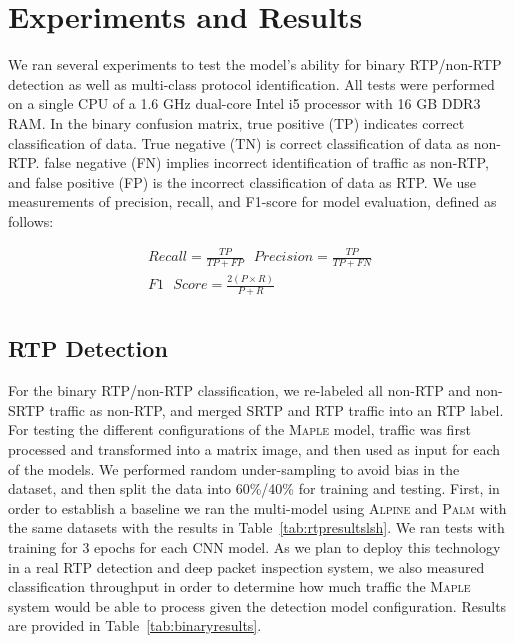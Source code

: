 \section{Experiments and Results}

We ran several experiments to test the model's ability for binary RTP/non-RTP detection as well as multi-class protocol identification. All tests were performed on a single CPU of a 1.6 GHz dual-core Intel i5 processor with 16 GB DDR3 RAM. In the binary confusion matrix, true positive (TP) indicates correct classification of data. True negative (TN) is correct classification of data as non-RTP. false negative (FN) implies incorrect identification of traffic as non-RTP, and false positive (FP) is the incorrect classification of data as RTP. We use measurements of precision, recall, and F1-score for model evaluation, defined as follows:

\begin{equation}
\begin{split}
    Recall = \frac{TP}{TP + FP} \text{  }
    Precision = \frac{TP}{TP + FN} \\
    F1\text{ }Score = \frac{2(P\times R)}{P + R} \\
    \end{split}
\end{equation}

\subsection{RTP Detection}

For the binary RTP/non-RTP classification, we re-labeled all non-RTP and non-SRTP traffic as non-RTP, and merged SRTP and RTP traffic into an RTP label. For testing the different configurations of the \textsc{Maple} model, traffic was first processed and transformed into a matrix image, and then used as input for each of the models. We performed random under-sampling to avoid bias in the dataset, and then split the data into 60\%/40\% for training and testing. First, in order to establish a baseline we ran the multi-model using \textsc{Alpine} and \textsc{Palm} with the same datasets with the results in Table~\ref{tab:rtpresultslsh}. We ran tests with training for $3$ epochs for each CNN model. As we plan to deploy this technology in a real RTP detection and deep packet inspection system, we also measured classification throughput in order to determine how much traffic the \textsc{Maple} system would be able to process given the detection model configuration. Results are provided in Table~\ref{tab:binaryresults}.

